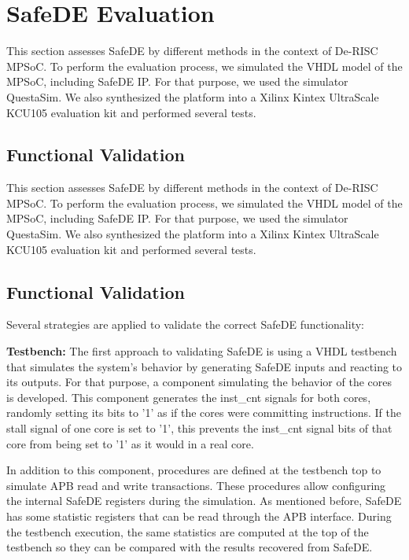 \clearpage\section{SafeDE Evaluation}

This section assesses SafeDE by different methods in the context of De-RISC MPSoC. To perform the evaluation process, we simulated the VHDL model of the MPSoC, including SafeDE IP. For that purpose, we used the simulator QuestaSim. We also synthesized the platform into a Xilinx Kintex UltraScale KCU105 evaluation kit and performed several tests. 

\subsection{Functional Validation}

This section assesses SafeDE by different methods in the context of De-RISC MPSoC. To perform the evaluation process, we simulated the VHDL model of the MPSoC, including SafeDE IP. For that purpose, we used the simulator QuestaSim. We also synthesized the platform into a Xilinx Kintex UltraScale KCU105 evaluation kit and performed several tests. 

\subsection{Functional Validation}

Several strategies are applied to validate the correct SafeDE functionality:

\textbf{Testbench:} The first approach to validating SafeDE is using a VHDL testbench that simulates the system's behavior by generating SafeDE inputs and reacting to its outputs. For that purpose, a component simulating the behavior of the cores is developed. This component generates the inst\_cnt signals for both cores, randomly setting its bits to '1' as if the cores were committing instructions. If the stall signal of one core is set to '1', this prevents the inst\_cnt signal bits of that core from being set to '1' as it would in a real core. 

In addition to this component,  procedures are defined at the testbench top to simulate APB read and write transactions. These procedures allow configuring the internal SafeDE registers during the simulation. As mentioned before, SafeDE has some statistic registers that can be read through the APB interface. During the testbench execution, the same statistics are computed at the top of the testbench so they can be compared with the results recovered from SafeDE. 

